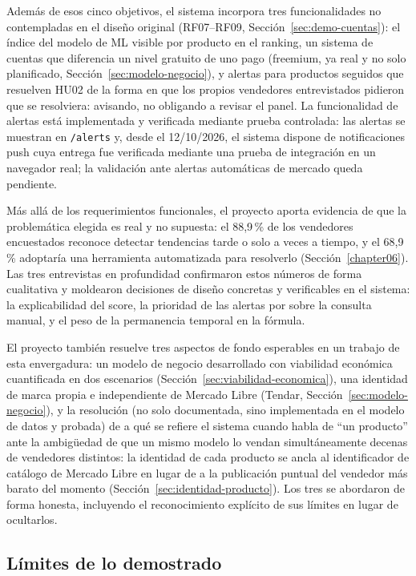 Además de esos cinco objetivos, el sistema incorpora tres funcionalidades no contempladas en el diseño original (RF07--RF09, Sección~\ref{sec:demo-cuentas}): el índice del modelo de ML visible por producto en el ranking, un sistema de cuentas que diferencia un nivel gratuito de uno pago (freemium, ya real y no solo planificado, Sección~\ref{sec:modelo-negocio}), y alertas para productos seguidos que resuelven HU02 de la forma en que los propios vendedores entrevistados pidieron que se resolviera: avisando, no obligando a revisar el panel. La funcionalidad de alertas está implementada y verificada mediante prueba controlada: las alertas se muestran en \texttt{/alerts} y, desde el 12/10/2026, el sistema dispone de notificaciones push cuya entrega fue verificada mediante una prueba de integración en un navegador real; la validación ante alertas automáticas de mercado queda pendiente.

Más allá de los requerimientos funcionales, el proyecto aporta evidencia de que la problemática elegida es real y no supuesta: el 88,9\,\% de los vendedores encuestados reconoce detectar tendencias tarde o solo a veces a tiempo, y el 68,9\,\% adoptaría una herramienta automatizada para resolverlo (Sección~\ref{chapter06}). Las tres entrevistas en profundidad confirmaron estos números de forma cualitativa y moldearon decisiones de diseño concretas y verificables en el sistema: la explicabilidad del score, la prioridad de las alertas por sobre la consulta manual, y el peso de la permanencia temporal en la fórmula.

El proyecto también resuelve tres aspectos de fondo esperables en un trabajo de esta envergadura: un modelo de negocio desarrollado con viabilidad económica cuantificada en dos escenarios (Sección~\ref{sec:viabilidad-economica}), una identidad de marca propia e independiente de Mercado Libre (Tendar, Sección~\ref{sec:modelo-negocio}), y la resolución (no solo documentada, sino implementada en el modelo de datos y probada) de a qué se refiere el sistema cuando habla de ``un producto'' ante la ambigüedad de que un mismo modelo lo vendan simultáneamente decenas de vendedores distintos: la identidad de cada producto se ancla al identificador de catálogo de Mercado Libre en lugar de a la publicación puntual del vendedor más barato del momento (Sección~\ref{sec:identidad-producto}). Los tres se abordaron de forma honesta, incluyendo el reconocimiento explícito de sus límites en lugar de ocultarlos.

\subsection*{Límites de lo demostrado}

